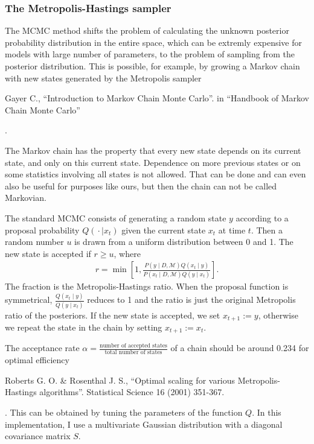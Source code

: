 \documentclass[letterpaper,12pt,english]{sphinxhowto}
\begin{document}
\subsubsection{The Metropolis-Hastings sampler}
\label{\detokenize{intro:mh-sampler}}\label{\detokenize{intro:the-metropolis-hastings-sampler}}
The MCMC method shifts the problem of calculating the unknown posterior
probability distribution in the entire space, which can be extremly expensive
for models with large number of parameters, to the problem of sampling from the
posterior distribution.
This is possible, for example, by growing a Markov chain with new states
generated by the Metropolis sampler %
\begin{footnote}[2]\sphinxAtStartFootnote
Gayer C., “Introduction to Markov Chain Monte Carlo”. in “Handbook of Markov Chain Monte Carlo” 
%
\end{footnote}.

The Markov chain has the property that every new state depends on its current
state, and only on this current state.
Dependence on more previous states or on some statistics involving
all states is not allowed.
That can be done and can even also be useful for purposes like ours, but then
the chain can not be called Markovian.

The standard MCMC consists of generating a random state \(y\) according to
a proposal probability \(Q({} \cdot \mid x_t)\) given the current state
\(x_t\) at time \(t\).
Then a random number \(u\) is drawn from a uniform distribution between 0
and 1.
The new state is accepted if \(r \ge u\), where
\begin{equation*}
\begin{split}r = \min \left[1, \frac{P(y \mid D, \mathcal{M}) Q(x_t \mid y)}{P(x_t \mid D, \mathcal{M}) Q(y \mid x_t)} \right].\end{split}
\end{equation*}
The fraction is the Metropolis-Hastings ratio.
When the proposal function is symmetrical, \(\frac{Q(x_t \mid y)}{Q(y \mid
x_t)}\) reduces to 1 and the ratio is just the original Metropolis ratio of the
posteriors.
If the new state is accepted, we set \(x_{t+1} := y\), otherwise we repeat
the state in the chain by setting \(x_{t+1} := x_t\).

The acceptance rate \(\alpha = \frac{\text{number of accepted
states}}{\text{total number of states}}\) of a chain should be around 0.234 for
optimal efficiency %
\begin{footnote}[3]\sphinxAtStartFootnote
Roberts G. O. \& Rosenthal J. S., “Optimal scaling for various Metropolis-Hastings algorithms”. Statistical Science 16 (2001) 351-367.
%
\end{footnote}.
This can be obtained by tuning the parameters of the function \(Q\).
In this implementation, I use a multivariate Gaussian distribution with a
diagonal covariance matrix \(S\).
\end{document}
